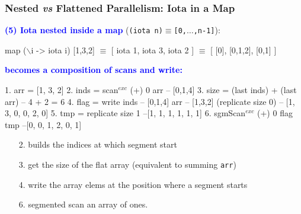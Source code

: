 \documentclass{beamer}
\newcommand{\blue}[1]{\textcolor{Blue}{{#1}}}
\renewcommand{\emph}[1]{\textcolor{structure}{#1}}
\newcommand{\emp}[1]{\textcolor{DikuRed}{ #1}}
\newcommand{\mymath}[1]{$ #1 $}
\newcommand{\myindu}[1]{^{#1}}
\begin{document}
\begin{frame}[fragile,t]
  \frametitle{Nested {\it vs} Flattened Parallelism: Iota in a Map}

\blue{\bf (5) Iota nested inside a map} ({\tt (iota n)$\equiv$[0,$\ldots$,n-1]}): 

\begin{colorcode}[fontsize=\scriptsize]
map (\mymath{\backslash}i -> iota i) \emp{[1,3,2]} \mymath{\equiv}
[ iota 1, iota 3, iota 2 ] \mymath{\equiv} [ [0], [0,1,2], [0,1] ]
\end{colorcode}

\bigskip
\pause

\blue{\bf becomes a composition of scans and write:}
\bigskip

\begin{colorcode}[fontsize=\scriptsize]
1. arr  = [1, 3, 2]
2. inds = scan\mymath{\myindu{exc}} (+) 0 arr         -- [0,1,4]
3. size = (last inds) + (last arr) -- 4 + 2 = 6
4. flag = write inds  -- \emp{[0,1,4]}
                arr   -- \emp{[1,3,2]}
                (replicate size 0)
--              [1, 3, 0, 0, 2, 0]
5. \emp{tmp  = replicate size 1  --[1, 1, 1, 1, 1, 1]}
6. sgmScan\mymath{\myindu{exc}} (+) 0 flag \emp{tmp} \emph{--[0, 0, 1, 2, 0, 1]}
\end{colorcode}

\bigskip

\begin{itemize}
    \item[2.] builds the indices at which segment start
    \item[3.] get the size of the flat array (equivalent to summing {\tt arr})
    \item[4.] write the array elems at the position where a segment starts
    \item[6.] \emp{segmented scan an array of ones}.
\end{itemize}

\end{frame}
\end{document}
